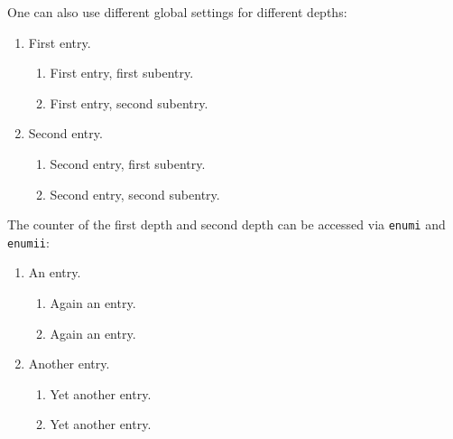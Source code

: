 \documentclass[a4paper, 10pt, abstract=on, headings=standardclasses]{scrartcl}
\begin{document}
\begin{itemize}
\begin{LTXexample}[pos = b]
\begin{enumerate}[label = \Roman*]
\begin{enumerate}[label = \arabic*]
          \end{enumerate}
      \end{enumerate}
    \end{LTXexample}
    One can also use different global settings for different depths:
    \begin{LTXexample}[pos = b]
      \begin{enumerate}
        \item
          First entry.
          \begin{enumerate}
            \item
              First entry, first subentry.
            \item
              First entry, second subentry.
          \end{enumerate}
        \item
          Second entry.
          \begin{enumerate}
            \item
              Second entry, first subentry.
            \item
              Second entry, second subentry.
          \end{enumerate}
      \end{enumerate}
    \end{LTXexample}
    The counter of the first depth and second depth can be accessed via \texttt{enumi} and \texttt{enumii}: 
    \begin{LTXexample}[pos = b]
      \begin{enumerate}
        \item
          An entry.
          \begin{enumerate}
            \item
              Again an entry.
            \item
              Again an entry.
          \end{enumerate}
        \item
          Another entry.
          \begin{enumerate}
            \item
              Yet another entry.
            \item
              Yet another entry.
          \end{enumerate}
      \end{enumerate}

\end{LTXexample}
\end{itemize}
\end{document}
